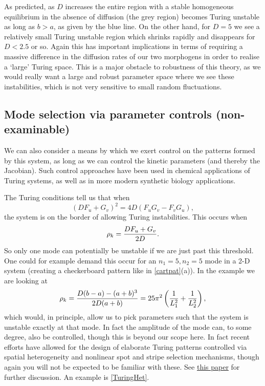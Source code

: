 \documentclass[main.tex]{subfiles}
\begin{document}
As predicted, as $D$ increases the entire region with a stable homogeneous equilibrium in the absence of diffusion (the grey region) becomes Turing unstable as long as $b>a$, as given by the blue line. On the other hand, for $D=5$ we see a relatively small Turing unstable region which shrinks rapidly and disappears for $D<2.5$ or so. Again this has important implications in terms of requiring a massive difference in the diffusion rates of our two morphogens in order to realise a `large' Turing space. This is a major obstacle to robustness of this theory, as we would really want a large and robust parameter space where we see these instabilities, which is not very sensitive to small random fluctuations.




\subsection{Mode selection via parameter controls (non-examinable)}
We can also consider a  means by which we exert control on the patterns formed by this system, as long as we can control the kinetic parameters (and thereby the Jacobian). Such control approaches have been used in chemical applications of Turing systems, as well as in more modern synthetic biology applications. 

The Turing conditions tell us that when 
\begin{equation}
(DF_u +G_v)^2 = 4D(F_uG_v-F_vG_u),
\end{equation}
 the system is on the border of allowing Turing instabilities. This occurs when 
\begin{equation}
\rho_k =  \frac{D F_u + G_v}{2D}.
\end{equation}
So only one mode can potentially be unstable if we are just past this threshold. One could for example demand this occur for an $n_1=5,n_2=5$ mode in a 2-D system (creating a checkerboard pattern like in  \cref{cartpat}(a)). 
In the example we are looking at 
\begin{equation}
\rho_k = \frac{D(b-a)-(a+b)^3}{2D(a+b)} = 25\pi^2\left(\frac{1}{L_1^2} +\frac{1}{L_2^2} \right),
\end{equation}
which would, in principle, allow us to pick parameters such that the system is unstable exactly at that mode. In fact the amplitude of the mode can, to some degree, also be controlled, though this is beyond our scope here. In fact recent efforts have allowed for the design of elaborate Turing patterns controlled via spatial heterogeneity and nonlinear spot and stripe selection mechanisms, though again you will not be expected to be familiar with these. See \href{https://link.springer.com/article/10.1007/s11538-021-00870-y}{this paper} for further discussion. An example is \cref{TuringHet}.
\end{document}
